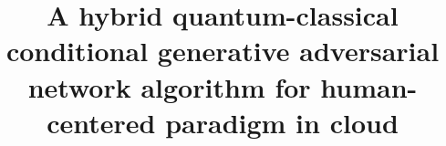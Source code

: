 \documentclass{bmcart}
\begin{document}
\begin{frontmatter}

\begin{fmbox}


\title{A hybrid quantum-classical conditional generative adversarial network algorithm for human-centered paradigm in cloud}


\author[
   addressref={aff1},                   %
   email={wenjiel@163.com}   %
]{ }
\author[
   addressref={aff2},
   corref={aff1},                       %
   email={1175666021@qq.com}
]{ }
\author[
   addressref={aff2},
   email={mtsdzl@163.com}
]{ }
\author[
   addressref={aff1},
   email={2759312576@qq.com}
]{ }
\author[
   addressref={aff3}
]{ }

\address[id=aff1]{%
  , %
  ,                     %
  ,                              %
}
\address[id=aff2]{%
  ,
  ,
  ,
}
\address[id=aff3]{%
  ,
  ,
}


\end{fmbox}
\end{frontmatter}
\end{document}
